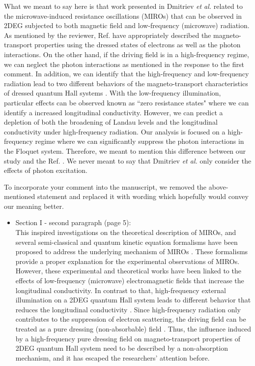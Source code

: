 \documentclass{article}
\begin{document}
What we meant to say here is that work presented in Dmitriev \textit{et al.} \cite{dmitriev09} related to the microwave-induced resistance oscillations (MIROs) that can be observed in 2DEG subjected to both magnetic field and low-frequency (microwave) radiation. As mentioned by the reviewer, Ref. \cite{dmitriev09} have appropriately described the magneto-transport properties using the dressed states of electrons as well as the photon interactions. On the other hand, if the driving field is in a high-frequency regime, we can neglect the photon interactions as mentioned in the response to the first comment. In addition, we can identify that the high-frequency and low-frequency radiation lead to two different behaviors of the magneto-transport characteristics of dressed quantum Hall systems \cite{dini16}. With the low-frequency illumination, particular effects can be observed known as ``zero resistance states" where we can identify a increased longitudinal conductivity. However, we can predict a depletion of both the broadening of Landau levels and the longitudinal conductivity under high-frequency radiation.
Our analysis is focused on a high-frequency regime where we can significantly suppress the photon interactions in the Floquet system. Therefore, we meant to mention this difference between our study and the Ref. \cite{dmitriev09}. We never meant to say that Dmitriev \textit{et al.} \cite{dmitriev09} only consider the effects of photon excitation.

To incorporate your comment into the manuscript, we removed the above-mentioned statement and replaced it with wording which hopefully would convey our meaning better.

\begin{itemize}
  \item Section I - second paragraph (page 5):\\
  {\color{Red}
  This inspired investigations on the theoretical description of MIROs, and several semi-classical and quantum kinetic equation formalisms have been proposed to address the underlying mechanism of MIROs \cite{durst03,dmitriev03,dmitriev05,dmitriev09}. These formalisms provide a proper explanation for the experimental observations of MIROs. However, these experimental and theoretical works have been linked to the effects of low-frequency (microwave) electromagnetic fields that increase the longitudinal conductivity.
  In contrast to that, high-frequency external illumination on a 2DEG quantum Hall system leads to different behavior that reduces the longitudinal conductivity \cite{dini16}.
  Since high-frequency radiation only contributes to the suppression of electron scattering, the driving field can be treated as a pure dressing (non-absorbable) field \cite{dini16}.
  Thus, the influence induced by a high-frequency pure dressing field on
  magneto-transport properties of 2DEG quantum Hall system need to be described by a non-absorption mechanism, and it has escaped the researchers’ attention before.
  }
\end{itemize}
\end{document}
